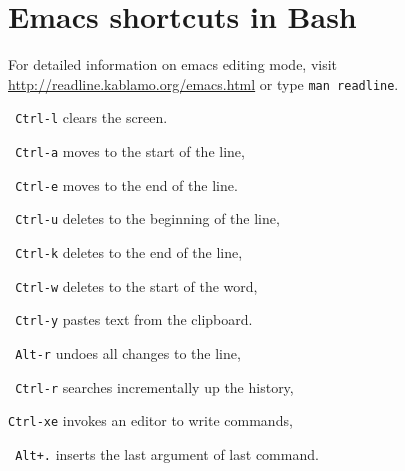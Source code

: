 \section{Emacs shortcuts in Bash}
For detailed information on emacs editing mode, visit 
\url{http://readline.kablamo.org/emacs.html} or type \texttt{man readline}.

\begin{compactenum}
\item [\texttt{ Ctrl-l}] clears the screen. 
\item [] 
\item [\texttt{ Ctrl-a}] moves to the start of the line,
\item [\texttt{ Ctrl-e}] moves to the end of the line. 
\item []
\item [\texttt{ Ctrl-u}] deletes to the beginning of the line,
\item [\texttt{ Ctrl-k}] deletes to the end of the line,
\item [\texttt{ Ctrl-w}] deletes to the start of the word,
\item [\texttt{ Ctrl-y}] pastes text from the clipboard.
\item []
\item [\texttt{ {} Alt-r}] undoes all changes to the line,
\item [\texttt{ Ctrl-r}] searches incrementally up the history,
\item [\texttt{Ctrl-xe}] invokes an editor to write commands,
\item [\texttt{ {} Alt+.}] inserts the last argument of last command.
\end{compactenum}

